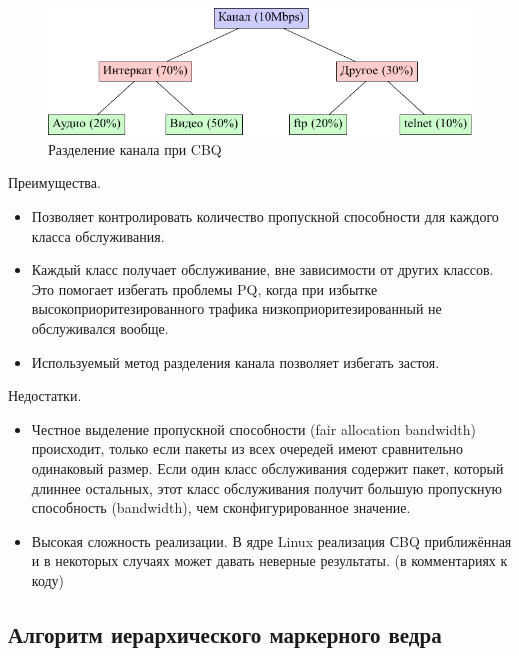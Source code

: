 		\begin{figure}[ht!]
			\includegraphics{./src/pdfimages/cbq.pdf}
			\caption{Разделение канала при CBQ}
		\end{figure}

        Преимущества.
		\begin{itemize}
        	\item Позволяет контролировать количество пропускной способности для каждого
                  класса обслуживания.
        	\item Каждый класс получает обслуживание, вне зависимости от других классов. Это
                  помогает избегать проблемы PQ, когда при избытке высокоприоритезированного
                  трафика низкоприоритезированный не обслуживался вообще.
			\item Используемый метод разделения канала позволяет избегать застоя.
		\end{itemize}

        Недостатки.
		\begin{itemize}
            \item Честное выделение пропускной способности (fair allocation bandwidth) происходит, только если
                  пакеты из всех очередей имеют сравнительно одинаковый размер. Если один класс
                  обслуживания содержит пакет, который длиннее остальных, этот класс обслуживания
                  получит большую пропускную способность (bandwidth), чем сконфигурированное значение.
			\item Высокая сложность реализации. В ядре Linux реализация СBQ приближённая и
				  в некоторых случаях может давать неверные результаты. (в комментариях к коду)
		\end{itemize}

	\subsection{Алгоритм иерархического маркерного ведра}

